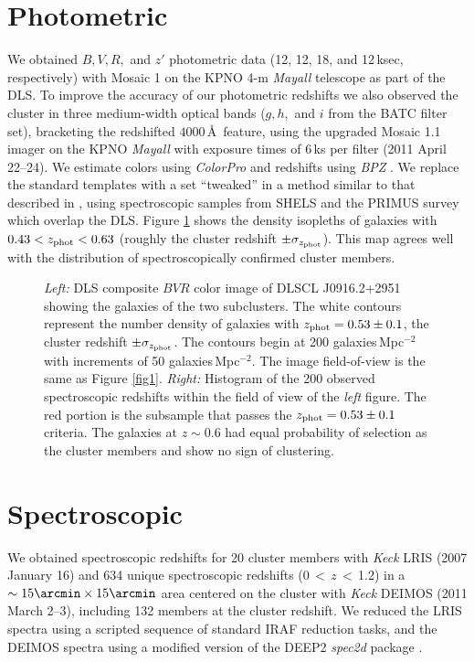\section{Photometric}

We obtained $B,V,R,$ and $z'$ photometric data (12, 12, 18, and 12\,ksec, respectively) with Mosaic 1 on the KPNO 4-m {\it Mayall} telescope as part of the DLS.
To improve the accuracy of our photometric redshifts we also observed the cluster in three medium-width optical bands ($g,h,$ and $i$ from the BATC filter set), bracketing the redshifted $4000$\,\AA\, feature, using the upgraded Mosaic 1.1 imager on the KPNO {\it Mayall} with exposure times of 6\,ks per filter (2011 April 22--24).
We estimate colors using \emph{ColorPro} \citep{coe06} and redshifts using \emph{BPZ} \citep{beni00}.
We replace the standard templates with a set ``tweaked'' in a method similar to that described in \citet{ilbe06}, using spectroscopic samples from SHELS \citep{gell05} and the PRIMUS survey \citep{coil10} which overlap the DLS.
Figure \ref{fig2} shows the density isopleths of galaxies with $0.43<z_{\rm phot}<0.63$ (roughly the cluster redshift $\pm\sigma_{z_{\rm phot}}$).
This map agrees well with the distribution of spectroscopically confirmed cluster members.

\begin{figure}
\caption{\emph{Left:} DLS composite $BVR$ color image of DLSCL J0916.2+2951 showing  the galaxies of the two subclusters. The white contours represent the number density of galaxies with $z_{\rm phot}=0.53\pm0.1$, the cluster redshift $\pm\sigma_{z_{\rm phot}}$. The contours begin at 200 galaxies\,Mpc$^{-2}$ with increments of 50 galaxies\,Mpc$^{-2}$. 
The image field-of-view is the same as Figure \ref{fig1}.
\emph{Right:} Histogram of the 200 observed spectroscopic redshifts within the field of view of the \emph{left} figure.  The red portion is the subsample that passes the $z_{\rm phot}=0.53\pm0.1$ criteria. The galaxies at $z\sim0.6$ had equal probability of selection as the cluster members and show no sign of clustering. 
\label{fig2}}
\end{figure}

\section{Spectroscopic}

We obtained spectroscopic redshifts for 20 cluster members with {\it Keck} LRIS (2007 January 16) and 634 unique spectroscopic redshifts (0\,$<$\,$z$\,$<$\,1.2)  in a $\sim15\arcmin\times 15\arcmin$ area centered on the cluster with {\it Keck} DEIMOS (2011 March 2--3), including 132 members at the cluster redshift.
We reduced the LRIS spectra using a scripted sequence of standard IRAF reduction tasks, and the DEIMOS spectra using a modified version of the DEEP2 \emph{spec2d} package \citep{davi03,gal08,lema09}.

